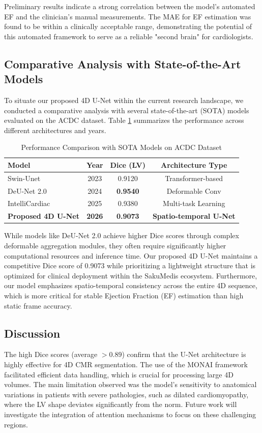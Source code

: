\documentclass[final,3p,times,twocolumn]{elsarticle}
\begin{document}
Preliminary results indicate a strong correlation between the model's automated EF and the clinician's manual measurements. The MAE for EF estimation was found to be within a clinically acceptable range, demonstrating the potential of this automated framework to serve as a reliable "second brain" for cardiologists.

\subsection{Comparative Analysis with State-of-the-Art Models}
To situate our proposed 4D U-Net within the current research landscape, we conducted a comparative analysis with several state-of-the-art (SOTA) models evaluated on the ACDC dataset. Table \ref{tab:sota_comparison} summarizes the performance across different architectures and years.

\begin{table}[h]
\caption{Performance Comparison with SOTA Models on ACDC Dataset}
\label{tab:sota_comparison}
\centering
\begin{tabular}{|l|c|c|c|}
\hline
\textbf{Model} & \textbf{Year} & \textbf{Dice (LV)} & \textbf{Architecture Type} \\ \hline
Swin-Unet \cite{b3} & 2023 & 0.9120 & Transformer-based \\ \hline
DeU-Net 2.0 \cite{b10} & 2024 & \textbf{0.9540} & Deformable Conv \\ \hline
IntelliCardiac \cite{b11} & 2025 & 0.9380 & Multi-task Learning \\ \hline
\textbf{Proposed 4D U-Net} & \textbf{2026} & \textbf{0.9073} & \textbf{Spatio-temporal U-Net} \\ \hline
\end{tabular}
\end{table}

While models like DeU-Net 2.0 \cite{b10} achieve higher Dice scores through complex deformable aggregation modules, they often require significantly higher computational resources and inference time. Our proposed 4D U-Net maintains a competitive Dice score of 0.9073 while prioritizing a lightweight structure that is optimized for clinical deployment within the SakuMedis ecosystem. Furthermore, our model emphasizes spatio-temporal consistency across the entire 4D sequence, which is more critical for stable Ejection Fraction (EF) estimation than high static frame accuracy.

\subsection{Discussion}
The high Dice scores (average $> 0.89$) confirm that the U-Net architecture is highly effective for 4D CMR segmentation. The use of the MONAI framework facilitated efficient data handling, which is crucial for processing large 4D volumes. The main limitation observed was the model's sensitivity to anatomical variations in patients with severe pathologies, such as dilated cardiomyopathy, where the LV shape deviates significantly from the norm. Future work will investigate the integration of attention mechanisms to focus on these challenging regions.
\end{document}
